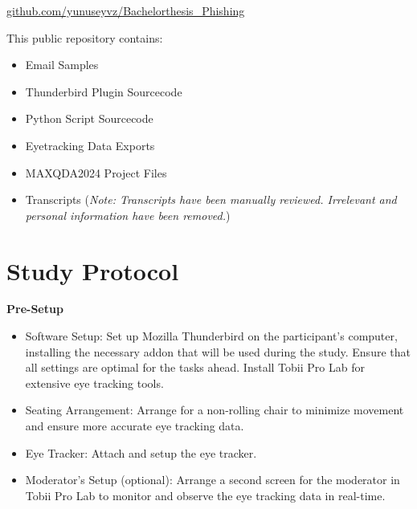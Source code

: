 \documentclass[
  a4paper,  %
  twoside,  %
  bibliography=totoc,
  headsepline,
  cleardoublepage=empty,
  parskip=half,
  draft=false
]{scrbook}
\begin{document}
{\large \faGithub} \hspace{2pt} \href{https://github.com/yunuseyvz/Bachelorthesis_Phishing}{github.com/yunuseyvz/Bachelorthesis\_Phishing}

\par
This public repository contains: 

\begin{itemize}
    \item Email Samples
    \item Thunderbird Plugin Sourcecode
    \item Python Script Sourcecode
    \item Eyetracking Data Exports 
    \item MAXQDA2024 Project Files 
    \item Transcripts (\textit{Note: Transcripts have been manually reviewed. Irrelevant and personal information have been removed.})

\end{itemize}

\section{Study Protocol}
\label{sec:protocol}

\textbf{Pre-Setup}
\begin{itemize}
    \item Software Setup: Set up Mozilla Thunderbird on the participant's computer, installing the necessary addon that will be used during the study. Ensure that all settings are optimal for the tasks ahead. Install Tobii Pro Lab for extensive eye tracking tools.
    \item Seating Arrangement: Arrange for a non-rolling chair to minimize movement and ensure more accurate eye tracking data.
    \item Eye Tracker: Attach and setup the eye tracker.
    \item Moderator's Setup (optional): Arrange a second screen for the moderator in Tobii Pro Lab to monitor and observe the eye tracking data in real-time.
\end{itemize}
\end{document}
